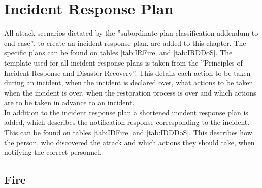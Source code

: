 \section{Incident Response Plan}

All attack scenarios dictated by the ”subordinate plan classification addendum to end case”, to create an incident response plan, are added to this chapter. The specific plans can be found on tables \ref{tab:IRFire} and \ref{tab:IRDDoS}. The template used for all incident response plans is taken from the ”Principles of Incident Response and Disaster Recovery”. This details each action to be taken during an incident, when the incident is declared over, what actions to be taken when the incident is over, when the restoration process is over and which actions are to be taken in advance to an incident.\\
In addition to the incident response plan a shortened incident response plan is added, which describes the notification response corresponding to the incident. This can be found on tables \ref{tab:IDFire} and \ref{tab:IDDDoS}. This describes how the person, who discovered the attack and which actions they should take, when notifying the correct personnel.

\subsection{Fire}

